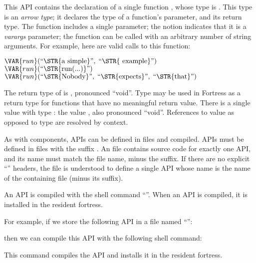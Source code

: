 This API contains the declaration of a single function ,
whose type is . This type is an
\emph{arrow type}; it declares the type of a function's parameter,
and its return type. The function  includes a single
parameter; the notion  indicates that it is a
\emph{varargs} parameter; the function  can be called with an
arbitrary number of string arguments. For example, here are
valid calls to this function:

\begin{Fortress}
\(\VAR{run}(\hbox{\rm``\STR{a~simple}''},\;\hbox{\rm``\STR{~example}''})\)\\
\(\VAR{run}(\hbox{\rm``\STR{run(...)}''})\)\\
\(\VAR{run}(\hbox{\rm``\STR{Nobody}''},\;\hbox{\rm``\STR{expects}''},\;\hbox{\rm``\STR{that}''})\)
\end{Fortress}


The return type of  is \EXP{()}, pronounced ``void''.
Type \EXP{()} may be used in Fortress as a return type
for functions that have no meaningful return value.
There is a single value with type \EXP{()}:
the value \EXP{()}, also pronounced ``void''.
References to value \EXP{()} as opposed
to type \EXP{()} are resolved by context.

As with components, APIs can be defined in files and compiled. APIs
must be defined in files with the suffix .
An  file contains
source code for exactly one API, and its name must match the file name,
minus the suffix.
If there are  no explicit ``''
headers, the file is understood to define a single API whose name is
the name of the containing file (minus its suffix).

An API is compiled with the shell command ``''.
When an API is compiled,
it is installed in the resident fortress.


For example, if we store
the following API in a file named ``'':

then we can compile this API with the following shell command:


This command compiles the API 
and installs it in the resident fortress.

